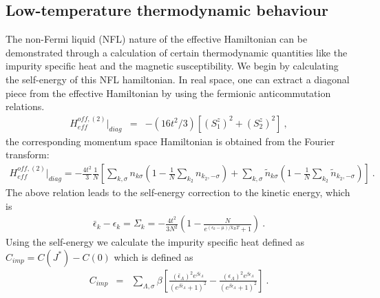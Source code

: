 \documentclass[10pt]{iopart}
\begin{document}
\subsection{Low-temperature thermodynamic behaviour}
The non-Fermi liquid (NFL) nature of the effective Hamiltonian can be demonstrated through a calculation of certain thermodynamic quantities like the impurity specific heat and the magnetic susceptibility. We begin by calculating the self-energy of this NFL hamiltonian. In real space, one can extract a diagonal piece from the effective Hamiltonian by using the fermionic anticommutation relations.
\begin{eqnarray}
H_{eff}^{off,(2)} |_{diag} &=& -(16t^2/3) [ (S_1^z)^2+ (S_2^z)^2 ] ~,
\end{eqnarray}
the corresponding momentum space Hamiltonian is obtained from the Fourier transform:
\begin{eqnarray}
H_{eff}^{off,(2)} |_{diag}= -\frac{4t^2}{3} \frac{1}{N} \left[ \displaystyle\sum_{k,\sigma} n_{k\sigma}(1-\frac{1}{N} \displaystyle\sum_{k_2}  n_{k_2,-\sigma}  ) + \displaystyle\sum_{k,\sigma} \tilde{n}_{k\sigma} ( 1-\frac{1}{N} \displaystyle\sum_{ k_2} \tilde{n}_{k_2,-\sigma}  ) \right]~.
\end{eqnarray}
The above relation leads to the self-energy correction to the kinetic energy, which is
\begin{eqnarray}
\bar{\epsilon} _k-\epsilon_k = \Sigma_k = -\frac{4t^2}{3N^2}\left(1-\frac{N}{e^{(\epsilon_k-\mu)/k_BT}+1}\right)~.
\label{eq:self-energy-NFL}
\end{eqnarray}
Using the self-energy we calculate the impurity specific heat defined as $C_{imp}=C(J^*)-C(0)$ which is defined as
\begin{eqnarray}
C_{imp} &=& \sum_{\Lambda,\sigma} \beta \left[ \frac{(\bar{\epsilon}_{\Lambda})^2 e^{\beta \bar{\epsilon}_{\Lambda}}}{( e^{\beta \bar{\epsilon}_{\Lambda}} +1)^2}  -\frac{({\epsilon}_{\Lambda})^2 e^{\beta {\epsilon}_{\Lambda}}}{( e^{\beta {\epsilon}_{\Lambda}} +1)^2} \right]~.
\end{eqnarray}
\end{document}
